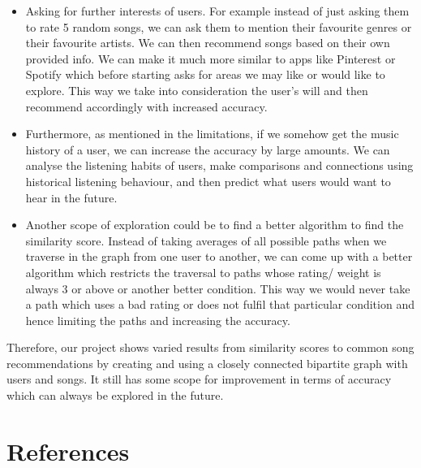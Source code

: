 \documentclass[fontsize=11pt]{article}
\begin{document}
\begin{itemize}
  \item Asking for further interests of users. For example instead of just asking them to rate 5 random songs, we can ask them to mention their favourite genres or their favourite artists. We can then recommend songs based on their own provided info. We can make it much more similar to apps like Pinterest or Spotify which before starting asks for areas we may like or would like to explore. This way we take into consideration the user’s will and then recommend accordingly with increased accuracy. 
  \item Furthermore, as mentioned in the limitations, if we somehow get the music history of a user, we can increase the accuracy by large amounts. We can analyse the listening habits of users, make comparisons and connections using historical listening behaviour, and then predict what users would want to hear in the future. 
  \item Another scope of exploration could be to find a better algorithm to find the similarity score. Instead of taking averages of all possible paths when we traverse in the graph from one user to another, we can come up with a better algorithm which restricts the traversal to paths whose rating/ weight is always 3 or above or another better condition. This way we would never take a path which uses a bad rating or does not fulfil that particular condition and hence limiting the paths and increasing the accuracy.
\end{itemize}
Therefore, our project shows varied results from similarity scores to common song recommendations by creating and using a closely connected bipartite graph with users and songs. It still has some scope for improvement in terms of accuracy which can always be explored in the future. 





\section*{References}
\end{document}
